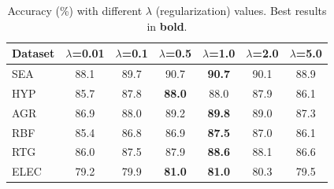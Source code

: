 \begin{table}[t]
\centering
\caption{Accuracy (\%) with different $\lambda$ (regularization) values. Best results in \textbf{bold}.}
\label{tab:lambda_sensitivity}
\begin{tabular}{lcccccc}
\toprule
Dataset & $\lambda$=0.01 & $\lambda$=0.1 & $\lambda$=0.5 & $\lambda$=1.0 & $\lambda$=2.0 & $\lambda$=5.0 \\
\midrule
SEA & 88.1 & 89.7 & 90.7 & \textbf{90.7} & 90.1 & 88.9 \\
HYP & 85.7 & 87.8 & \textbf{88.0} & 88.0 & 87.9 & 86.1 \\
AGR & 86.9 & 88.0 & 89.2 & \textbf{89.8} & 89.0 & 87.3 \\
RBF & 85.4 & 86.8 & 86.9 & \textbf{87.5} & 87.0 & 86.1 \\
RTG & 86.0 & 87.5 & 87.9 & \textbf{88.6} & 88.1 & 86.6 \\
ELEC & 79.2 & 79.9 & \textbf{81.0} & \textbf{81.0} & 80.3 & 79.5 \\
\bottomrule
\end{tabular}
\end{table}